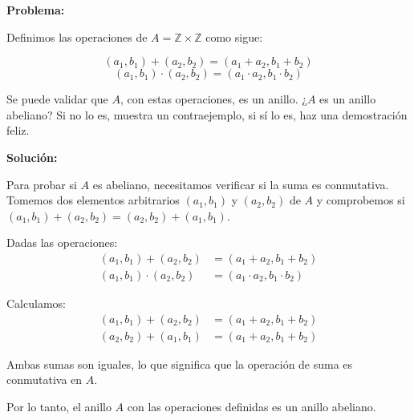 \documentclass{article}
\begin{document}
\textbf{Problema:}

Definimos las operaciones de \( A = \mathbb{Z} \times \mathbb{Z} \) como sigue:

\[
(a_1, b_1) + (a_2, b_2) = (a_1 + a_2, b_1 + b_2)
\]
\[
(a_1, b_1) \cdot (a_2, b_2) = (a_1 \cdot a_2, b_1 \cdot b_2)
\]

Se puede validar que \( A \), con estas operaciones, es un anillo. ¿\( A \) es un anillo abeliano? Si no lo es, muestra un contraejemplo, si sí lo es, haz una demostración feliz.

\textbf{Solución:}

Para probar si \( A \) es abeliano, necesitamos verificar si la suma es conmutativa. Tomemos dos elementos arbitrarios \( (a_1, b_1) \) y \( (a_2, b_2) \) de \( A \) y comprobemos si \( (a_1, b_1) + (a_2, b_2) = (a_2, b_2) + (a_1, b_1) \).

Dadas las operaciones:
\begin{align*}
(a_1, b_1) + (a_2, b_2) &= (a_1 + a_2, b_1 + b_2) \\
(a_1, b_1) \cdot (a_2, b_2) &= (a_1 \cdot a_2, b_1 \cdot b_2)
\end{align*}

Calculamos:
\begin{align*}
(a_1, b_1) + (a_2, b_2) &= (a_1 + a_2, b_1 + b_2) \\
(a_2, b_2) + (a_1, b_1) &= (a_1 + a_2, b_1 + b_2)
\end{align*}

Ambas sumas son iguales, lo que significa que la operación de suma es conmutativa en \( A \).

Por lo tanto, el anillo \( A \) con las operaciones definidas es un anillo abeliano.
\end{document}
